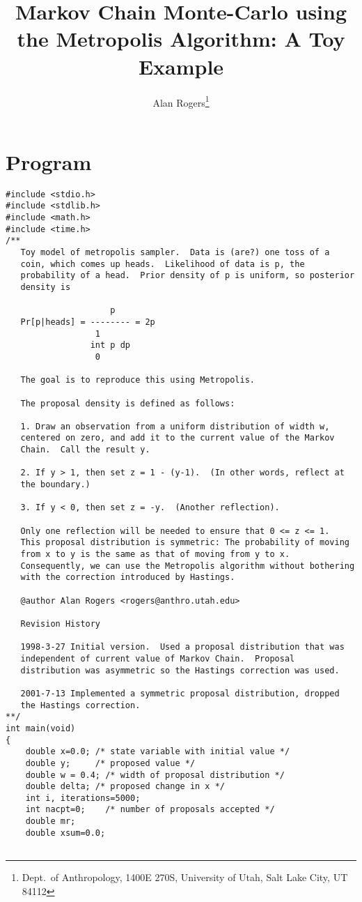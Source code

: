 \documentclass[11pt]{article}
\begin{document}
\title{Markov Chain Monte-Carlo using the Metropolis Algorithm: A Toy
Example} 
\author{Alan Rogers\thanks{Dept.\ of Anthropology, 1400E 270S,
University of Utah, Salt Lake City, UT 84112}}
\maketitle

\section{Program}
\begin{verbatim}
#include <stdio.h>
#include <stdlib.h>
#include <math.h>
#include <time.h>
/**
   Toy model of metropolis sampler.  Data is (are?) one toss of a
   coin, which comes up heads.  Likelihood of data is p, the
   probability of a head.  Prior density of p is uniform, so posterior
   density is

                     p
   Pr[p|heads] = -------- = 2p
                  1
                 int p dp
                  0 

   The goal is to reproduce this using Metropolis.  

   The proposal density is defined as follows:

   1. Draw an observation from a uniform distribution of width w,
   centered on zero, and add it to the current value of the Markov
   Chain.  Call the result y.

   2. If y > 1, then set z = 1 - (y-1).  (In other words, reflect at
   the boundary.)

   3. If y < 0, then set z = -y.  (Another reflection).

   Only one reflection will be needed to ensure that 0 <= z <= 1.
   This proposal distribution is symmetric: The probability of moving
   from x to y is the same as that of moving from y to x.
   Consequently, we can use the Metropolis algorithm without bothering
   with the correction introduced by Hastings.

   @author Alan Rogers <rogers@anthro.utah.edu>

   Revision History

   1998-3-27 Initial version.  Used a proposal distribution that was
   independent of current value of Markov Chain.  Proposal
   distribution was asymmetric so the Hastings correction was used.

   2001-7-13 Implemented a symmetric proposal distribution, dropped
   the Hastings correction.
**/
int main(void)
{
    double x=0.0; /* state variable with initial value */
    double y;     /* proposed value */
    double w = 0.4; /* width of proposal distribution */
    double delta; /* proposed change in x */
    int i, iterations=5000;
    int nacpt=0;    /* number of proposals accepted */
    double mr;
    double xsum=0.0;


\end{verbatim}
\end{document}
